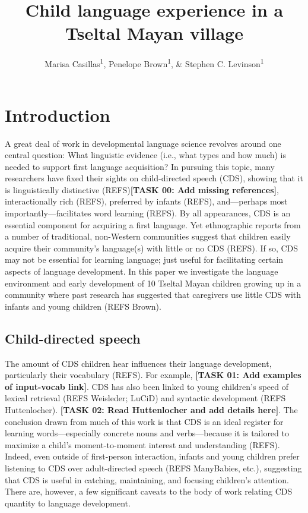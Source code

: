 \documentclass[floatsintext,man]{apa6}
\title{Child language experience in a Tseltal Mayan village}
\author{Marisa Casillas\textsuperscript{1}, Penelope Brown\textsuperscript{1}, \& Stephen C. Levinson\textsuperscript{1}}
\affiliation{
    \vspace{0.5cm}
          \textsuperscript{1} Max Planck Institute for Psycholinguistics  }
\theoremstyle{definition}
\theoremstyle{definition}
\theoremstyle{definition}
\theoremstyle{remark}
\begin{document}
\maketitle

\setcounter{secnumdepth}{0}



\section{Introduction}\label{intro}

A great deal of work in developmental language science revolves around
one central question: What linguistic evidence (i.e., what types and how
much) is needed to support first language acquisition? In pursuing this
topic, many researchers have fixed their sights on child-directed speech
(CDS), showing that it is linguistically distinctive
(REFS)\textbf{{[}TASK 00: Add missing references{]}}, interactionally
rich (REFS), preferred by infants (REFS), and---perhaps most
importantly---facilitates word learning (REFS). By all appearances, CDS
is an essential component for acquiring a first language. Yet
ethnographic reports from a number of traditional, non-Western
communities suggest that children easily acquire their community's
language(s) with little or no CDS (REFS). If so, CDS may not be
essential for learning language; just useful for facilitating certain
aspects of language development. In this paper we investigate the
language environment and early development of 10 Tseltal Mayan children
growing up in a community where past research has suggested that
caregivers use little CDS with infants and young children (REFS Brown).

\subsection{Child-directed speech}\label{intro-cds}

The amount of CDS children hear influences their language development,
particularly their vocabulary (REFS). For example, \textbf{{[}TASK 01:
Add examples of input-vocab link{]}}. CDS has also been linked to young
children's speed of lexical retrieval (REFS Weisleder; LuCiD) and
syntactic development (REFS Huttenlocher). \textbf{{[}TASK 02: Read
Huttenlocher and add details here{]}}. The conclusion drawn from much of
this work is that CDS is an ideal register for learning
words---especially concrete nouns and verbs---because it is tailored to
maximize a child's moment-to-moment interest and understanding (REFS).
Indeed, even outside of first-person interaction, infants and young
children prefer listening to CDS over adult-directed speech (REFS
ManyBabies, etc.), suggesting that CDS is useful in catching,
maintaining, and focusing children's attention. There are, however, a
few significant caveats to the body of work relating CDS quantity to
language development.
\end{document}
